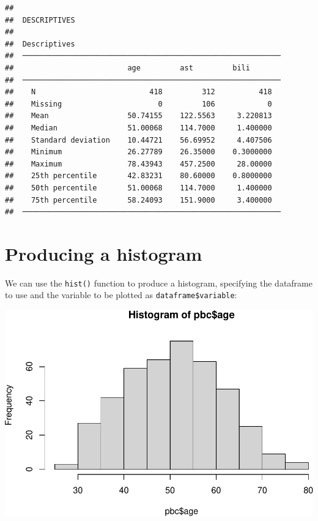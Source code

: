 \documentclass[
]{memoir}
\newenvironment{Shaded}{\begin{snugshade}}{\end{snugshade}}
\newcommand{\FunctionTok}[1]{\textcolor[rgb]{0.00,0.00,0.00}{#1}}
\newcommand{\NormalTok}[1]{#1}
\newcommand{\SpecialCharTok}[1]{\textcolor[rgb]{0.00,0.00,0.00}{#1}}
\begin{document}
\begin{verbatim}
## 
##  DESCRIPTIVES
## 
##  Descriptives                                                
##  ─────────────────────────────────────────────────────────── 
##                          age         ast         bili        
##  ─────────────────────────────────────────────────────────── 
##    N                          418         312          418   
##    Missing                      0         106            0   
##    Mean                  50.74155    122.5563     3.220813   
##    Median                51.00068    114.7000     1.400000   
##    Standard deviation    10.44721    56.69952     4.407506   
##    Minimum               26.27789    26.35000    0.3000000   
##    Maximum               78.43943    457.2500     28.00000   
##    25th percentile       42.83231    80.60000    0.8000000   
##    50th percentile       51.00068    114.7000     1.400000   
##    75th percentile       58.24093    151.9000     3.400000   
##  ───────────────────────────────────────────────────────────
\end{verbatim}

\hypertarget{producing-a-histogram}{%
\section{Producing a histogram}\label{producing-a-histogram}}

We can use the \texttt{hist()} function to produce a histogram, specifying the dataframe to use and the variable to be plotted as \texttt{dataframe\$variable}:

\begin{Shaded}
\end{Shaded}

\includegraphics{phcm9795-R-notes_files/figure-latex/unnamed-chunk-32-1.pdf}
\end{document}
